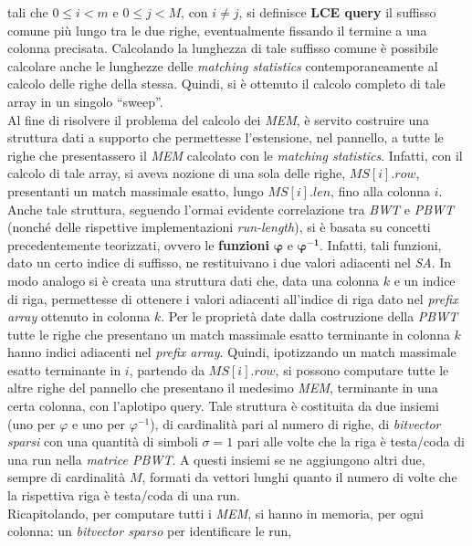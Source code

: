 \documentclass[a4paper,11pt, oneside]{article}
\begin{document}
tali che $0\leq i <m$ e $0\leq j <M$, con $i\neq j$, si definisce \textbf{LCE
  query} il suffisso comune più lungo tra le due righe, eventualmente fissando
il termine a una colonna precisata. Calcolando la
lunghezza di tale suffisso comune è possibile calcolare anche le
lunghezze delle \textit{matching statistics} contemporaneamente al calcolo delle
righe della stessa. Quindi, si è ottenuto il calcolo completo di tale array in
un singolo ``sweep''.\\
Al fine di risolvere il problema del calcolo dei \textit{MEM}, è
servito 
costruire una struttura dati a supporto che permettesse l'estensione, nel
pannello, a tutte le righe che presentassero il \textit{MEM} calcolato con le
\textit{matching statistics}. Infatti, con il calcolo di tale array, si aveva
nozione di una sola delle righe, $MS[i].row$, presentanti un match massimale
esatto, lungo 
$MS[i].len$, fino alla colonna $i$. Anche tale struttura, seguendo l'ormai
evidente correlazione tra \textit{BWT} e \textit{PBWT} (nonché delle rispettive
implementazioni \textit{run-length}), si è basata su concetti precedentemente
teorizzati, ovvero le \textbf{funzioni} $\boldsymbol\varphi$ e
$\boldsymbol\varphi^{\mathbf{-1}}$. Infatti, tali
funzioni, dato un certo indice di suffisso, ne restituivano i due valori
adiacenti nel \textit{SA}. In
modo analogo si è creata una struttura dati che, data una colonna $k$ e un
indice di riga, permettesse di ottenere i valori adiacenti all'indice di riga
dato nel \textit{prefix array} ottenuto in colonna $k$. Per le proprietà date
dalla costruzione della \textit{PBWT} tutte le righe che presentano un match
massimale esatto terminante in colonna $k$ hanno indici adiacenti nel
\textit{prefix array}. Quindi, ipotizzando un match massimale esatto terminante
in $i$, partendo da 
$MS[i].row$, si possono computare tutte le altre righe del pannello che
presentano il medesimo \textit{MEM}, terminante in una certa colonna, con
l'aplotipo query. Tale 
struttura è costituita 
da due insiemi (uno per $\varphi$ e uno per $\varphi^{-1}$), di cardinalità pari
  al numero di righe, di \textit{bitvector sparsi} con una quantità di simboli 
$\sigma=1$ pari alle volte che la riga è testa/coda di una run nella
\textit{matrice PBWT}. A questi insiemi
se ne aggiungono altri due, sempre di cardinalità
$M$, formati da vettori lunghi 
quanto il numero di volte che la rispettiva riga è testa/coda di una run.\\
Ricapitolando, per computare tutti i \textit{MEM}, si hanno in
memoria, per ogni colonna: un \textit{bitvector sparso} per identificare le run,
\end{document}
